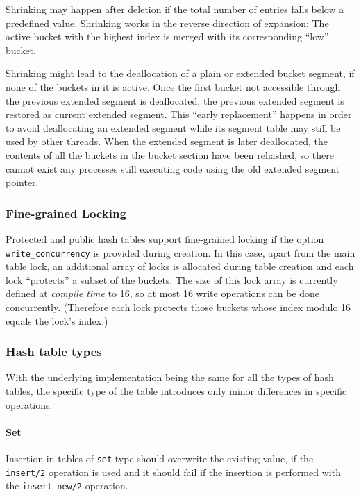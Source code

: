 \documentclass[aps,pre,preprint,nofootinbib]{revtex4}
\begin{document}
Shrinking may happen after deletion if the total number of entries falls below a predefined value.
Shrinking works in the reverse direction of expansion:
The active bucket with the highest index is merged with its corresponding ``low'' bucket.

Shrinking might lead to the deallocation of a plain or extended bucket segment, if none of the buckets in it is active.
Once the first bucket not accessible through the previous extended segment is deallocated, the previous extended segment is restored as current extended segment.
This ``early replacement'' happens in order to avoid deallocating an extended segment while its segment table may still be used by other threads.
When the extended segment is later deallocated, the contents of all the buckets in the bucket section have been rehashed, so there cannot exist any processes still executing code using the old extended segment pointer.

\subsubsection{Fine-grained Locking}\label{sec:hash_fine_locking}

Protected and public hash tables support fine-grained locking if the option \verb|write_concurrency| is provided during creation.
In this case, apart from the main table lock, an additional array of locks is allocated during table creation and each lock ``protects'' a subset of the buckets.
The size of this lock array is currently defined at \emph{compile time} to 16, so at most 16 write operations can be done concurrently.
(Therefore each lock protects those buckets whose index modulo 16 equals the lock's index.)


\subsubsection{Hash table types}     %

With the underlying implementation being the same for all the types of hash tables, the specific type of the table introduces only minor differences in specific operations.

\paragraph{Set}

Insertion in tables of \verb|set| type should overwrite the existing value, if the \verb|insert/2| operation is used and it should fail if the insertion is performed with the \verb|insert_new/2| operation.
\end{document}
